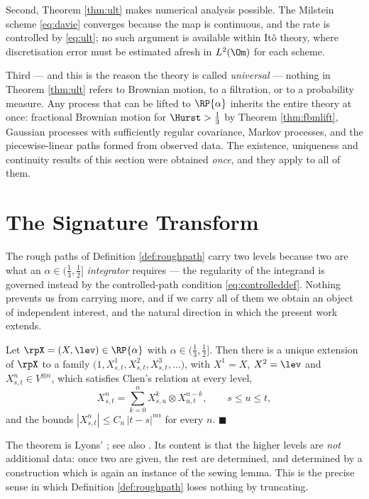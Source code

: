 Second, Theorem \ref{thm:ult} makes numerical analysis possible. The Milstein scheme
\eqref{eq:davie} converges because the map is continuous, and the rate is controlled by
\eqref{eq:ult}; no such argument is available within Itô theory, where discretisation error must be
estimated afresh in $L^2(\Om)$ for each scheme.

Third --- and this is the reason the theory is called \emph{universal} --- nothing in Theorem
\ref{thm:ult} refers to Brownian motion, to a filtration, or to a probability measure. Any process
that can be lifted to $\RP{\alpha}$ inherits the entire theory at once: fractional Brownian motion
for $\Hurst>\tfrac13$ by Theorem \ref{thm:fbmlift}, Gaussian processes with sufficiently regular
covariance, Markov processes, and the piecewise-linear paths formed from observed data. The
existence, uniqueness and continuity results of this section were obtained \emph{once}, and they
apply to all of them.

\section{The Signature Transform}\label{sec:signature}

The rough paths of Definition \ref{def:roughpath} carry two levels because two are what an
$\alpha \in (\tfrac13,\tfrac12]$ \emph{integrator} requires --- the regularity of the integrand is
governed instead by the controlled-path condition \eqref{eq:controlleddef}. Nothing prevents us from
carrying more, and if we carry all of them we obtain an object of independent interest, and the
natural direction in which the present work extends.

\begin{theorem}\label{thm:lyonsextension}
Let $\rpX = (X,\lev) \in \RP{\alpha}$ with $\alpha \in (\tfrac13,\tfrac12]$. Then there is a unique
extension of $\rpX$ to a family
$\bigl(1, X^1_{s,t}, X^2_{s,t}, X^3_{s,t},\dots\bigr)$, with $X^1 = X$, $X^2 = \lev$ and
$X^n_{s,t} \in V^{\otimes n}$, which satisfies Chen's relation at every level,
\begin{equation}\label{eq:chenalllevels}
X^{n}_{s,t} = \sum_{k=0}^{n} X^{k}_{s,u}\otimes X^{n-k}_{u,t}, \qquad s\leq u\leq t,
\end{equation}
and the bounds $|X^n_{s,t}| \leq C_n\,|t-s|^{n\alpha}$ for every $n$. \hfill $\blacksquare$
\end{theorem}

The theorem is Lyons' \cite{lyons1998}; see also \cite[Ch.\ 3]{geng2021}. Its content is that the
higher levels are \emph{not} additional data: once two are given, the rest are determined, and
determined by a construction which is again an instance of the sewing lemma. This is the precise
sense in which Definition \ref{def:roughpath} loses nothing by truncating.

